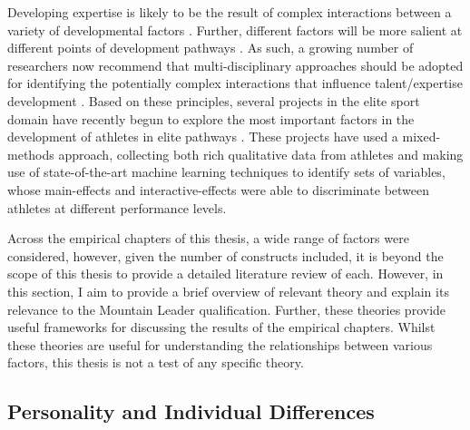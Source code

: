 \documentclass[
  12pt,
  a4paper,
]{book}
\begin{document}
Developing expertise is likely to be the result of complex interactions between a variety of developmental factors \citep[e.g., practice and training, personality traits, motivation, social support;][]{Baker2013, Gagne2004, Johnston2018}. Further, different factors will be more salient at different points of development pathways \citep{Rees2016}. As such, a growing number of researchers now recommend that multi-disciplinary approaches should be adopted for identifying the potentially complex interactions that influence talent/expertise development \citep[e.g.,][]{Abernethy2013, Gullich2019, Johnston2018, Pearson2006, Rees2016, Schorer2013}. Based on these principles, several projects in the elite sport domain have recently begun to explore the most important factors in the development of athletes in elite pathways \citep[e.g.,][]{Gullich2019, Hardy2017, Jones2019a, Jones2019b, Jones2020, Rees2016}. These projects have used a mixed-methods approach, collecting both rich qualitative data from athletes and making use of state-of-the-art machine learning techniques to identify sets of variables, whose main-effects and interactive-effects were able to discriminate between athletes at different performance levels.

Across the empirical chapters of this thesis, a wide range of factors were considered, however, given the number of constructs included, it is beyond the scope of this thesis to provide a detailed literature review of each. However, in this section, I aim to provide a brief overview of relevant theory and explain its relevance to the Mountain Leader qualification. Further, these theories provide useful frameworks for discussing the results of the empirical chapters. Whilst these theories are useful for understanding the relationships between various factors, this thesis is not a test of any specific theory.

\hypertarget{gen-intro-paid}{%
\subsection{Personality and Individual Differences}\label{gen-intro-paid}}
\end{document}
